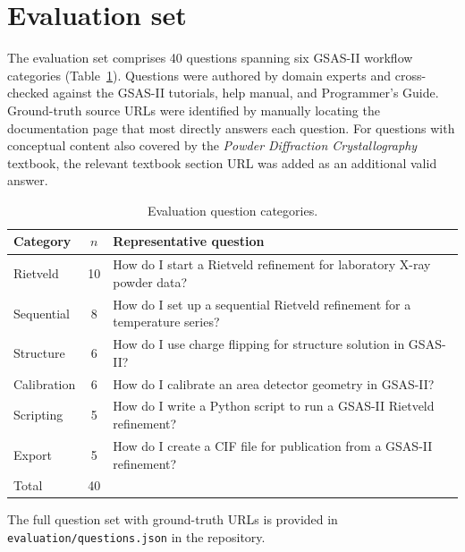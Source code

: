 \documentclass[12pt,a4paper]{article}
\begin{document}
\section{Evaluation set}
\label{sec:eval}

The evaluation set comprises 40 questions spanning six GSAS-II workflow
categories (Table~\ref{tab:categories}).
Questions were authored by domain experts and cross-checked against the
GSAS-II tutorials, help manual, and Programmer's Guide.
Ground-truth source URLs were identified by manually locating the
documentation page that most directly answers each question.
For questions with conceptual content also covered by the
\textit{Powder Diffraction Crystallography} textbook, the relevant
textbook section URL was added as an additional valid answer.

\begin{table}[htbp]
  \centering
  \caption{Evaluation question categories.}
  \label{tab:categories}
  \begin{tabular}{lcp{9cm}}
    \toprule
    Category & $n$ & Representative question \\
    \midrule
    Rietveld    & 10 & How do I start a Rietveld refinement for laboratory X-ray powder data? \\
    Sequential  & 8  & How do I set up a sequential Rietveld refinement for a temperature series? \\
    Structure   & 6  & How do I use charge flipping for structure solution in GSAS-II? \\
    Calibration & 6  & How do I calibrate an area detector geometry in GSAS-II? \\
    Scripting   & 5  & How do I write a Python script to run a GSAS-II Rietveld refinement? \\
    Export      & 5  & How do I create a CIF file for publication from a GSAS-II refinement? \\
    \midrule
    Total       & 40 & \\
    \bottomrule
  \end{tabular}
\end{table}

The full question set with ground-truth URLs is provided in
\texttt{evaluation/questions.json} in the repository.

\end{document}
